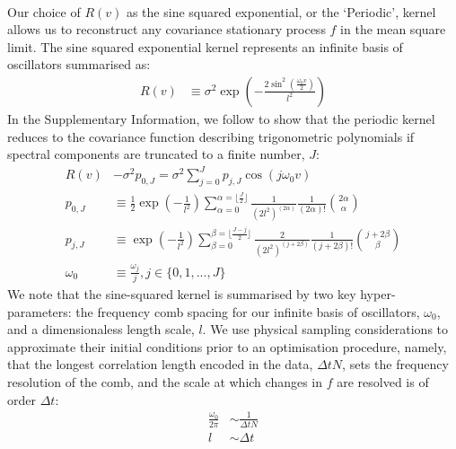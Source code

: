 \\
Our choice of $R(v)$ as the sine squared exponential, or the `Periodic', kernel allows us to reconstruct any covariance stationary process $f$ in the mean square limit. The sine squared exponential kernel represents an infinite basis of oscillators summarised as:
\begin{align}
R(v) &\equiv \sigma^2 \exp (- \frac{2\sin^2(\frac{\omega_0 v}{2})}{l^2}) 
\end{align}
In the Supplementary Information, we follow \cite{solin2014} to show that the periodic kernel reduces to the covariance function describing trigonometric polynomials if spectral components are truncated to a finite number, $J$:
\begin{align}
R(v) &- \sigma^2 p_{0,J}  = \sigma^2 \sum_{j=0}^{J} p_{j,J} \cos(j\omega_0 v)\\
p_{0,J} & \equiv \frac{1}{2} \exp (- \frac{1}{l^2}) \sum_{\alpha = 0}^{\alpha = \lfloor\frac{J}{2}\rfloor} \frac{1}{(2l^2)^{(2\alpha)}} \frac{1}{(2\alpha)!} \binom{2\alpha}{\alpha} \label{eqn:p0J}\\
p_{j,J} & \equiv \exp (- \frac{1}{l^2}) \sum_{\beta = 0}^{\beta = \lfloor\frac{J-j}{2}\rfloor} \frac{2}{(2l^2)^{(j + 2\beta)}} \frac{1}{(j + 2\beta)!} \binom{j + 2\beta}{\beta} \label{eqn:pjJ} \\
\omega_0 &\equiv \frac{\omega_j}{j}, j \in \{0, 1,..., J\} 
\end{align}
We note that the sine-squared kernel is summarised by two key hyper-parameters: the frequency comb spacing for our infinite basis of oscillators, $\omega_0$, and a dimensionaless length scale, $l$. We use physical sampling considerations to approximate their initial conditions prior to an optimisation procedure, namely, that the longest correlation length encoded in the data, $\Delta t N$, sets the frequency resolution of the comb, and the scale at which changes in $f$ are resolved is of order  $\Delta t$:
\begin{align}
\frac{\omega_0}{2\pi} & \sim  \frac{1}{\Delta t N} \\
l & \sim \Delta t
\end{align}
